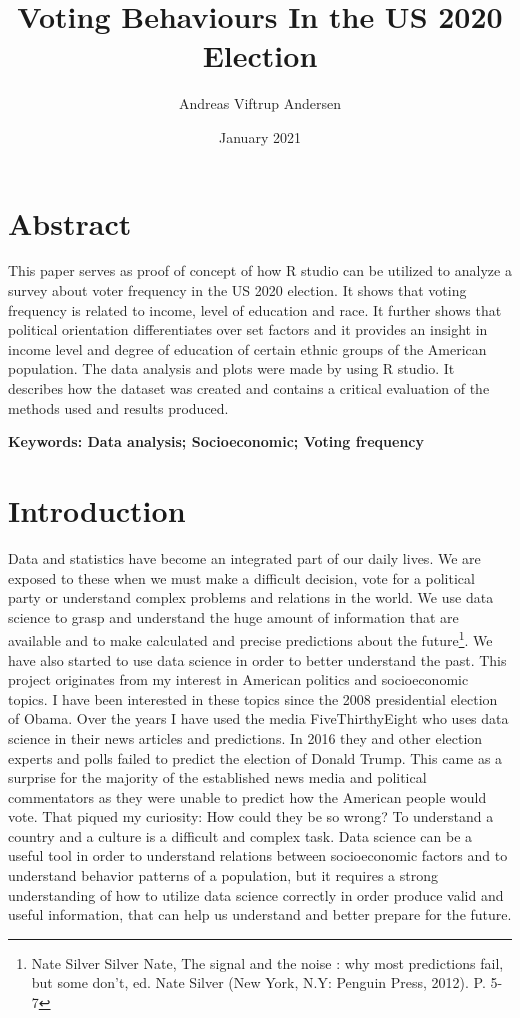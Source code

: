 \documentclass{article}
\title{Voting Behaviours In the US 2020 Election}
\author{Andreas Viftrup Andersen}
\date{January 2021}
\begin{document}
\maketitle

\section{Abstract}
This paper serves as proof of concept of how R studio can be utilized to analyze a survey about voter frequency in the US 2020 election. It shows that voting frequency is related to income, level of education and race. It further shows that political orientation differentiates over set factors and it provides an insight in income level and degree of education of certain ethnic groups of the American population. The data analysis and plots were made by using R studio. It describes how the dataset was created and contains a critical evaluation of the methods used and results produced. 

\vspace{}
\textbf{Keywords:
Data analysis; Socioeconomic; Voting frequency }


\pagebreak

\tableofcontents

\pagebreak

\section{Introduction}
Data and statistics have become an integrated part of our daily lives. We are exposed to these when we must make a difficult decision, vote for a political party or understand complex problems and relations in the world. We use data science to grasp and understand the huge amount of information that are available and to make calculated and precise predictions about the future\footnote{Nate Silver Silver Nate, The signal and the noise : why most predictions fail, but some don't, ed. Nate Silver (New York, N.Y: Penguin Press, 2012). P. 5-7}.  We have also started to use data science in order to better understand the past. This project originates from my interest in American politics and socioeconomic topics. I have been interested in these topics since the 2008 presidential election of Obama. Over the years I have used the media FiveThirthyEight who uses data science in their news articles and predictions. In 2016 they and other election experts and polls failed to predict the election of Donald Trump. This came as a surprise for the majority of the established news media and political commentators as they were unable to predict how the American people would vote. That piqued my curiosity: How could they be so wrong? To understand a country and a culture is a difficult and complex task. Data science can be a useful tool in order to understand relations between socioeconomic factors and to understand behavior patterns of a population, but it requires a strong understanding of how to utilize data science correctly  in order produce valid and useful information, that can help us understand and better prepare for the future. 
\end{document}
